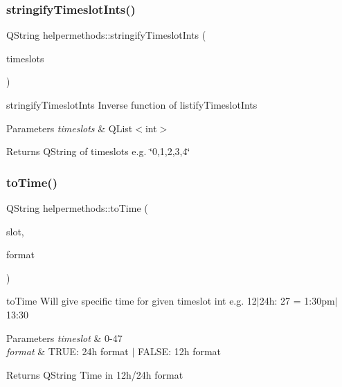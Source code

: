 \subsubsection{\texorpdfstring{stringify\+Timeslot\+Ints()}{stringifyTimeslotInts()}}
{\footnotesize\ttfamily Q\+String helpermethods\+::stringify\+Timeslot\+Ints (\begin{DoxyParamCaption}\item[{Q\+List$<$ int $>$}]{timeslots }\end{DoxyParamCaption})\hspace{0.3cm}{\ttfamily [static]}}



stringify\+Timeslot\+Ints Inverse function of listify\+Timeslot\+Ints 


\begin{DoxyParams}{Parameters}
{\em timeslots} & Q\+List$<$int$>$ \\
\hline
\end{DoxyParams}
\begin{DoxyReturn}{Returns}
Q\+String of timeslots e.\+g. \char`\"{}0,1,2,3,4\char`\"{} 
\end{DoxyReturn}
\mbox{\label{classhelpermethods_a5357a7fde87ac02fce1e8ed64aa53648}} 
\subsubsection{\texorpdfstring{to\+Time()}{toTime()}}
{\footnotesize\ttfamily Q\+String helpermethods\+::to\+Time (\begin{DoxyParamCaption}\item[{int}]{slot,  }\item[{bool}]{format }\end{DoxyParamCaption})\hspace{0.3cm}{\ttfamily [static]}}



to\+Time Will give specific time for given timeslot int e.\+g. 12$\vert$24h\+: 27 = 1\+:30pm$\vert$13\+:30 


\begin{DoxyParams}{Parameters}
{\em timeslot} & 0-\/47 \\
\hline
{\em format} & T\+R\+UE\+: 24h format $\vert$ F\+A\+L\+SE\+: 12h format \\
\hline
\end{DoxyParams}
\begin{DoxyReturn}{Returns}
Q\+String Time in 12h/24h format 
\end{DoxyReturn}
\mbox{\label{classhelpermethods_a3ab55da6e3e7558936e9881f30465e75}} 
